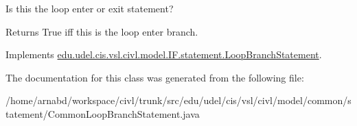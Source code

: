 Is this the loop enter or exit statement? 

\begin{DoxyReturn}{Returns}
True iff this is the loop enter branch. 
\end{DoxyReturn}


Implements \hyperlink{interfaceedu_1_1udel_1_1cis_1_1vsl_1_1civl_1_1model_1_1IF_1_1statement_1_1LoopBranchStatement_afa07dbebdfb9955f5896b3ec10677865}{edu.\+udel.\+cis.\+vsl.\+civl.\+model.\+I\+F.\+statement.\+Loop\+Branch\+Statement}.



The documentation for this class was generated from the following file\+:\begin{DoxyCompactItemize}
\item 
/home/arnabd/workspace/civl/trunk/src/edu/udel/cis/vsl/civl/model/common/statement/Common\+Loop\+Branch\+Statement.\+java\end{DoxyCompactItemize}
